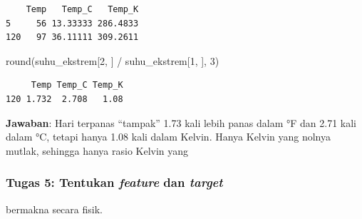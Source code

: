 \documentclass[
  indonesian,
  letterpaper,
]{book}
\newenvironment{Shaded}{\begin{snugshade}}{\end{snugshade}}
\newcommand{\DecValTok}[1]{\textcolor[rgb]{0.68,0.00,0.00}{#1}}
\newcommand{\FloatTok}[1]{\textcolor[rgb]{0.68,0.00,0.00}{#1}}
\newcommand{\FunctionTok}[1]{\textcolor[rgb]{0.28,0.35,0.67}{#1}}
\newcommand{\NormalTok}[1]{\textcolor[rgb]{0.00,0.23,0.31}{#1}}
\newcommand{\OtherTok}[1]{\textcolor[rgb]{0.00,0.23,0.31}{#1}}
\newcommand{\SpecialCharTok}[1]{\textcolor[rgb]{0.37,0.37,0.37}{#1}}
\newcommand{\StringTok}[1]{\textcolor[rgb]{0.13,0.47,0.30}{#1}}
\begin{document}
\begin{Shaded}
\end{Shaded}

\begin{verbatim}
    Temp   Temp_C   Temp_K
5     56 13.33333 286.4833
120   97 36.11111 309.2611
\end{verbatim}

\begin{Shaded}
\begin{Highlighting}[]
\FunctionTok{round}\NormalTok{(suhu\_ekstrem[}\DecValTok{2}\NormalTok{, ] }\SpecialCharTok{/}\NormalTok{ suhu\_ekstrem[}\DecValTok{1}\NormalTok{, ], }\DecValTok{3}\NormalTok{)}
\end{Highlighting}
\end{Shaded}

\begin{verbatim}
     Temp Temp_C Temp_K
120 1.732  2.708   1.08
\end{verbatim}

\textbf{Jawaban}: Hari terpanas ``tampak'' 1.73 kali lebih panas dalam
°F dan 2.71 kali dalam °C, tetapi hanya 1.08 kali dalam Kelvin. Hanya
Kelvin yang nolnya mutlak, sehingga hanya rasio Kelvin yang

\subsubsection{\texorpdfstring{Tugas 5: Tentukan \emph{feature} dan
\emph{target}}{Tugas 5: Tentukan feature dan target}}\label{tugas-5-tentukan-feature-dan-target}

bermakna secara fisik.
\end{document}
